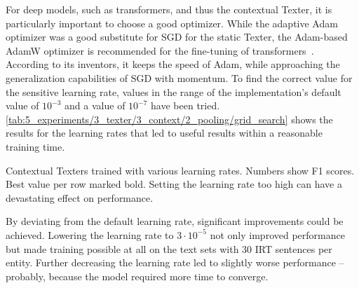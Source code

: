 For deep models, such as transformers, and thus the contextual Texter, it is particularly important to choose a good optimizer. While the adaptive Adam optimizer was a good substitute for SGD for the static Texter, the Adam-based AdamW optimizer is recommended for the fine-tuning of transformers~\cite{Loshchilov2019DecoupledWD}. According to its inventors, it keeps the speed of Adam, while approaching the generalization capabilities of SGD with momentum. To find the correct value for the sensitive learning rate, values in the range of the implementation's default value of $10^{-3}$ and a value of $10^{-7}$ have been tried. \autoref{tab:5_experiments/3_texter/3_context/2_pooling/grid_search} shows the results for the learning rates that led to useful results within a reasonable training time.

\begin{table}[t!]
    \centering
    
    \caption{Contextual Texters trained with various learning rates. Numbers show F1 scores. Best value per row marked bold. Setting the learning rate too high can have a devastating effect on performance.}
    \label{tab:5_experiments/3_texter/3_context/3_optimizer/grid_search}
\end{table}

By deviating from the default learning rate, significant improvements could be achieved. Lowering the learning rate to $3 \cdot 10^{-5}$ not only improved performance but made training possible at all on the text sets with 30 IRT sentences per entity. Further decreasing the learning rate led to slightly worse performance -- probably, because the model required more time to converge.
